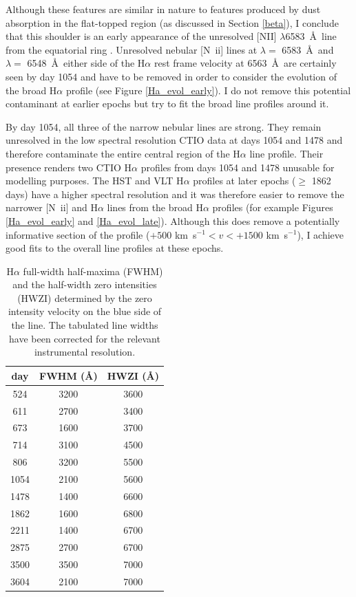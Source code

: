 Although these features are similar in nature to features produced by dust 
absorption in the flat-topped region (as discussed in Section \ref{beta}), 
I conclude that this shoulder is an early appearance of the unresolved 
[NII] $\lambda$6583~\AA\ line from the equatorial ring \citep{Kozma1998b}.  Unresolved nebular [N~{\sc ii}] lines at $\lambda=$ 6583~\AA\ and 
$\lambda=$ 6548~\AA\ either side of the H$\alpha$ rest frame velocity at 
6563~\AA\ are certainly seen by day 1054 
and have to be removed in order to consider the evolution of the broad 
H$\alpha$ profile (see Figure \ref{Ha_evol_early}). I do not remove this 
potential contaminant at earlier epochs but try to fit the broad line 
profiles around it.





 
By day 1054, all three of the narrow nebular lines are strong.  They 
remain unresolved in the low spectral resolution CTIO data at days 1054 
and 1478 and therefore contaminate the entire central region of the 
H$\alpha$ line profile.  Their presence renders two CTIO H$\alpha$ 
profiles from days 1054 and 1478 unusable for modelling purposes.  The HST 
and VLT H$\alpha$ profiles at later epochs ($\ge$ 1862 days) have a higher 
spectral resolution and it was therefore easier to remove the narrower 
[N~{\sc ii}] and H$\alpha$ lines from the broad H$\alpha$ profiles (for 
example Figures \ref{Ha_evol_early} and \ref{Ha_evol_late}). Although this 
does remove a potentially informative section of the profile ($+500$ 
km~s$^{-1}<v<+1500$ km~s$^{-1}$), I achieve good fits to the overall line 
profiles at these epochs.

\begin{table}
\centering
\caption{H$\alpha$ full-width half-maxima (FWHM) and the half-width zero 
intensities (HWZI) determined by the zero intensity velocity on the 
blue side of the line.  The tabulated line widths have been corrected for the relevant instrumental resolution.}
\begin{tabular}{c cc}
day & FWHM (\AA) & HWZI (\AA) \\
\hline
524 & 3200 & 3600 \\
611 & 2700 & 3400 \\
673 & 1600 & 3700 \\
714 & 3100 & 4500 \\
806 & 3200 & 5500 \\
1054 & 2100 & 5600 \\
1478 & 1400 & 6600 \\
1862 & 1600 & 6800 \\
2211 & 1400 & 6700 \\
2875 & 2700 & 6700 \\
3500 & 3500 & 7000 \\
3604 & 2100 & 7000

\end{tabular}

\label{FWHM}
\end{table}%

